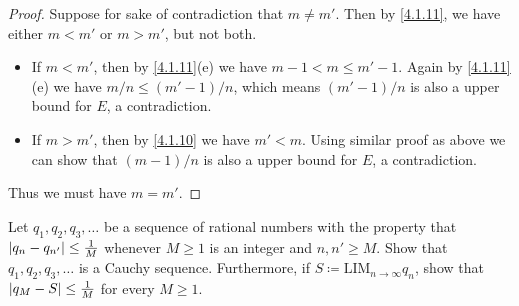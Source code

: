 \begin{proof}
  Suppose for sake of contradiction that \(m \neq m'\).
  Then by \cref{4.1.11}, we have either \(m < m'\) or \(m > m'\), but not both.
  \begin{itemize}
    \item If \(m < m'\), then by \cref{4.1.11}(e) we have \(m - 1 < m \leq m' - 1\).
          Again by \cref{4.1.11}(e) we have \(m / n \leq (m' - 1) / n\), which means \((m' - 1) / n\) is also a upper bound for \(E\), a contradiction.
    \item If \(m > m'\), then by \cref{4.1.10} we have \(m' < m\).
          Using similar proof as above we can show that \((m - 1) / n\) is also a upper bound for \(E\), a contradiction.
  \end{itemize}
  Thus we must have \(m = m'\).
\end{proof}

\begin{exercise}\label{ex 5.5.4}
  Let \(q_1, q_2, q_3, \dots\) be a sequence of rational numbers with the property that \(\left\lvert q_n - q_{n'}\right\rvert \leq \frac{1}{M}\) whenever \(M \geq 1\) is an integer and \(n, n' \geq M\).
  Show that \(q_1, q_2, q_3, \dots\) is a Cauchy sequence.
  Furthermore, if \(S \coloneqq \text{LIM}_{n \to \infty} q_n\), show that \(\left\lvert q_M - S\right\rvert \leq \frac{1}{M}\) for every \(M \geq 1\).
\end{exercise}

